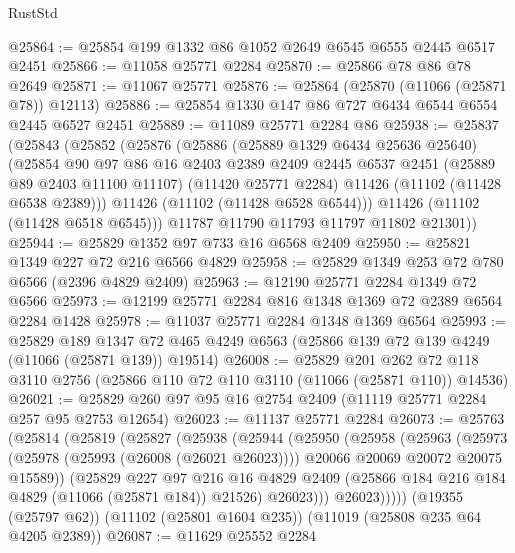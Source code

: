 \begin{lexlean}{RustStd}
\begin{coremodule}
@25864 := @25854 @199 @1332 @86 @1052 @2649 @6545 @6555 @2445 @6517 @2451
@25866 := @11058 @25771 @2284
@25870 := @25866 @78 @86 @78 @2649
@25871 := @11067 @25771
@25876 := @25864 (@25870 (@11066 (@25871 @78)) @12113)
@25886 := @25854 @1330 @147 @86 @727 @6434 @6544 @6554 @2445 @6527 @2451
@25889 := @11089 @25771 @2284 @86
@25938 := @25837
    (@25843
      (@25852
        (@25876
          (@25886
            (@25889 @1329 @6434 @25636 @25640)
            (@25854
              @90
              @97
              @86
              @16
              @2403
              @2389
              @2409
              @2445
              @6537
              @2451
              (@25889 @89 @2403 @11100 @11107)
              (@11420 @25771 @2284)
              @11426
              (@11102 (@11428 @6538 @2389)))
            @11426
            (@11102 (@11428 @6528 @6544)))
          @11426
          (@11102 (@11428 @6518 @6545)))
        @11787
        @11790
        @11793
        @11797
        @11802
        @21301))
@25944 := @25829 @1352 @97 @733 @16 @6568 @2409
@25950 := @25821 @1349 @227 @72 @216 @6566 @4829
@25958 := @25829 @1349 @253 @72 @780 @6566 (@2396 @4829 @2409)
@25963 := @12190 @25771 @2284 @1349 @72 @6566
@25973 := @12199 @25771 @2284 @816 @1348 @1369 @72 @2389 @6564 @2284 @1428
@25978 := @11037 @25771 @2284 @1348 @1369 @6564
@25993 := @25829
    @189
    @1347
    @72
    @465
    @4249
    @6563
    (@25866 @139 @72 @139 @4249 (@11066 (@25871 @139)) @19514)
@26008 := @25829
    @201
    @262
    @72
    @118
    @3110
    @2756
    (@25866 @110 @72 @110 @3110 (@11066 (@25871 @110)) @14536)
@26021 := @25829 @260 @97 @95 @16 @2754 @2409 (@11119 @25771 @2284 @257 @95 @2753 @12654)
@26023 := @11137 @25771 @2284
@26073 := @25763
    (@25814
      (@25819
        (@25827
          (@25938
            (@25944
              (@25950
                (@25958
                  (@25963
                    (@25973
                      (@25978 (@25993 (@26008 (@26021 @26023))))
                      @20066
                      @20069
                      @20072
                      @20075
                      @15589))
                  (@25829
                    @227
                    @97
                    @216
                    @16
                    @4829
                    @2409
                    (@25866 @184 @216 @184 @4829 (@11066 (@25871 @184)) @21526)
                    @26023)))
              @26023)))))
    (@19355 (@25797 @62))
    (@11102 (@25801 @1604 @235))
    (@11019 (@25808 @235 @64 @4205 @2389))
@26087 := @11629
    @25552
    @2284

\end{coremodule}
\end{lexlean}
